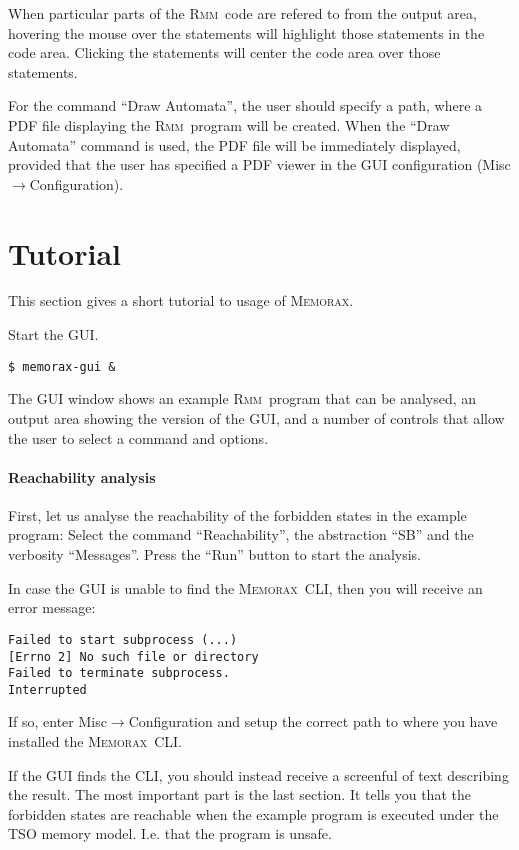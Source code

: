 \documentclass[a4paper]{article}
\newcommand{\memorax}{\textsc{Memorax}}
\newcommand{\rmm}{\textsc{Rmm}}
\begin{document}
When particular parts of the \rmm\ code are refered to from the output
area, hovering the mouse over the statements will highlight those
statements in the code area. Clicking the statements will center the
code area over those statements.

For the command ``Draw Automata'', the user should specify a path,
where a PDF file displaying the \rmm\ program will be created. When the
``Draw Automata'' command is used, the PDF file will be immediately
displayed, provided that the user has specified a PDF viewer in the
GUI configuration (Misc$\rightarrow$Configuration).

\section{Tutorial}

This section gives a short tutorial to usage of \memorax.

Start the GUI.

\noindent
\begin{verbatim}
$ memorax-gui &
\end{verbatim}

The GUI window shows an example \rmm\ program that can be analysed, an
output area showing the version of the GUI, and a number of controls
that allow the user to select a command and options.

\paragraph{Reachability analysis}
First, let us analyse the reachability of the forbidden states in the
example program: Select the command ``Reachability'', the abstraction
``SB'' and the verbosity ``Messages''. Press the ``Run'' button to
start the analysis.

In case the GUI is unable to find the \memorax\ CLI, then you will receive
an error message:

\noindent
\begin{verbatim}
Failed to start subprocess (...)
[Errno 2] No such file or directory
Failed to terminate subprocess.
Interrupted
\end{verbatim}

If so, enter Misc$\rightarrow$Configuration and setup the correct path
to where you have installed the \memorax\ CLI.

If the GUI finds the CLI, you should instead receive a screenful of
text describing the result. The most important part is the last
section. It tells you that the forbidden states are reachable when the
example program is executed under the TSO memory model. I.e. that the
program is unsafe.
\end{document}
